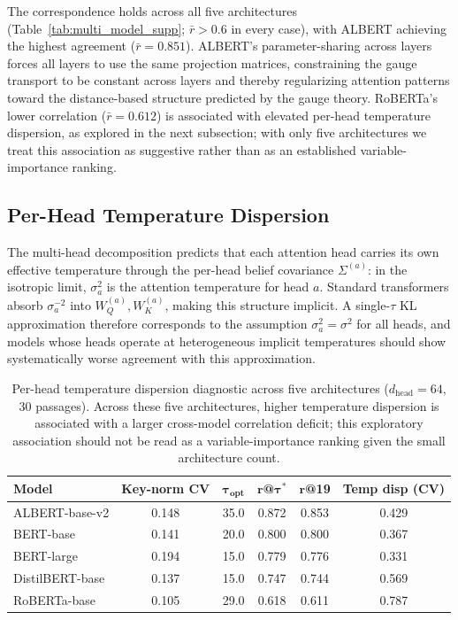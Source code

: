 \documentclass[twoside,11pt]{article}
\begin{document}
The correspondence holds across all five architectures (Table~\ref{tab:multi_model_supp}; $\bar{r} > 0.6$ in every case), with ALBERT achieving the highest agreement ($\bar{r} = 0.851$). ALBERT's parameter-sharing across layers forces all layers to use the same projection matrices, constraining the gauge transport to be constant across layers and thereby regularizing attention patterns toward the distance-based structure predicted by the gauge theory. RoBERTa's lower correlation ($\bar{r} = 0.612$) is associated with elevated per-head temperature dispersion, as explored in the next subsection; with only five architectures we treat this association as suggestive rather than as an established variable-importance ranking.

\subsection{Per-Head Temperature Dispersion}

The multi-head decomposition predicts that each attention head carries its own effective temperature through the per-head belief covariance $\Sigma^{(a)}$: in the isotropic limit, $\sigma_a^2$ is the attention temperature for head $a$. Standard transformers absorb $\sigma_a^{-2}$ into $W_Q^{(a)}, W_K^{(a)}$, making this structure implicit. A single-$\tau$ KL approximation therefore corresponds to the assumption $\sigma_a^2 = \sigma^2$ for all heads, and models whose heads operate at heterogeneous implicit temperatures should show systematically worse agreement with this approximation.

\begin{table}[h]
\centering
\renewcommand{\arraystretch}{1.15}
\begin{tabular}{lccccc}
\hline
\textbf{Model} & \textbf{Key-norm CV} & $\boldsymbol{\tau}_{\textbf{opt}}$ & $\boldsymbol{r}$\textbf{@}$\boldsymbol{\tau^*}$ & $\boldsymbol{r}$\textbf{@19} & \textbf{Temp disp (CV)} \\
\hline
ALBERT-base-v2 & 0.148 & 35.0 & 0.872 & 0.853 & 0.429 \\
BERT-base & 0.141 & 20.0 & 0.800 & 0.800 & 0.367 \\
BERT-large & 0.194 & 15.0 & 0.779 & 0.776 & 0.331 \\
DistilBERT-base & 0.137 & 15.0 & 0.747 & 0.744 & 0.569 \\
RoBERTa-base & 0.105 & 29.0 & 0.618 & 0.611 & 0.787 \\
\hline
\end{tabular}
\caption{Per-head temperature dispersion diagnostic across five architectures ($d_{\text{head}} = 64$, 30 passages). Across these five architectures, higher temperature dispersion is associated with a larger cross-model correlation deficit; this exploratory association should not be read as a variable-importance ranking given the small architecture count.}
\label{tab:temp_dispersion_supp}
\end{table}
\end{document}
